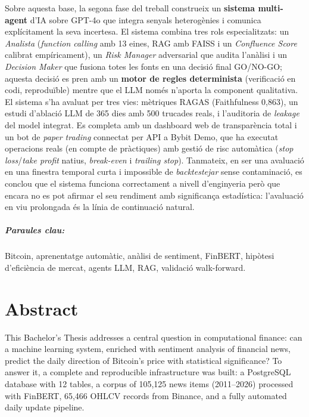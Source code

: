 \documentclass[12pt, a4paper]{report}
\begin{document}
Sobre aquesta base, la segona fase del treball construeix un \textbf{sistema multi-agent} d'IA sobre GPT-4o que integra senyals heterogènies i comunica explícitament la seva incertesa. El sistema combina tres rols especialitzats: un \textit{Analista} (\textit{function calling} amb 13 eines, RAG amb FAISS i un \textit{Confluence Score} calibrat empíricament), un \textit{Risk Manager} adversarial que audita l'anàlisi i un \textit{Decision Maker} que fusiona totes les fonts en una decisió final GO/NO-GO; aquesta decisió es pren amb un \textbf{motor de regles determinista} (verificació en codi, reproduïble) mentre que el LLM només n'aporta la component qualitativa. El sistema s'ha avaluat per tres vies: mètriques RAGAS (Faithfulness 0,863), un estudi d'ablació LLM de 365 dies amb 500 trucades reals, i l'auditoria de \textit{leakage} del model integrat. Es completa amb un dashboard web de transparència total i un bot de \textit{paper trading} connectat per API a Bybit Demo, que ha executat operacions reals (en compte de pràctiques) amb gestió de risc automàtica (\textit{stop loss}/\textit{take profit} natius, \textit{break-even} i \textit{trailing stop}). Tanmateix, en ser una avaluació en una finestra temporal curta i impossible de \textit{backtestejar} sense contaminació, es conclou que el sistema funciona correctament a nivell d'enginyeria però que encara no es pot afirmar el seu rendiment amb significança estadística: l'avaluació en viu prolongada és la línia de continuació natural.

\paragraph{Paraules clau:} Bitcoin, aprenentatge automàtic, anàlisi de sentiment, FinBERT, hipòtesi d'eficiència de mercat, agents LLM, RAG, validació walk-forward.
\endgroup

\chapter*{Abstract}
\begingroup{}

This Bachelor's Thesis addresses a central question in computational finance: can a machine learning system, enriched with sentiment analysis of financial news, predict the daily direction of Bitcoin's price with statistical significance? To answer it, a complete and reproducible infrastructure was built: a PostgreSQL database with 12 tables, a corpus of 105,125 news items (2011--2026) processed with FinBERT, 65,466 OHLCV records from Binance, and a fully automated daily update pipeline.
\end{document}
